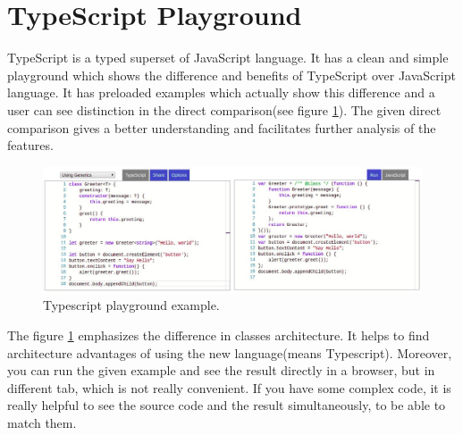 \section{TypeScript Playground} \label{sec:typescript}
TypeScript \cite{TypeScript} is a typed superset of JavaScript language. It has a clean and simple playground which shows the difference and benefits of TypeScript over JavaScript language. It has preloaded examples which actually show this difference and a user can see distinction in the direct comparison(see figure \ref{fig:typescript}). The given direct comparison gives a better understanding and facilitates further analysis of the features.
\begin{figure}[h!]
    \centering
    \includegraphics[width=\linewidth]{src/pic/typescript}
    \caption{Typescript playground example.}
    \label{fig:typescript}
\end{figure}
The figure \ref{fig:typescript} emphasizes the difference in classes architecture. It helps to find architecture advantages of using the new language(means Typescript). Moreover, you can run the given example and see the result directly in a browser, but in different tab, which is not really convenient. If you have some complex code, it is really helpful to see the source code and the result simultaneously, to be able to match them.

